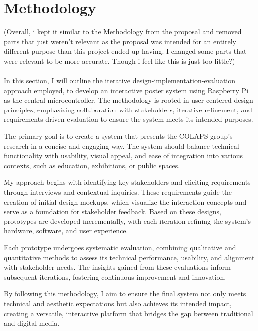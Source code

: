 \chapter{Methodology}
\label{sec:Methodology}

(Overall, i kept it similar to the Methodology from the proposal and removed parts that just weren't relevant as the proposal was intended for an entirely different purpose than this project ended up having. I changed some parts that were relevant to be more accurate. Though i feel like this is just too little?)\\\\



In this section, I will outline the iterative design-implementation-evaluation approach employed, to develop an interactive poster system using Raspberry Pi as the central microcontroller. The methodology is rooted in user-centered design principles, emphasizing collaboration with stakeholders, iterative refinement, and requirements-driven evaluation to ensure the system meets its intended purposes.

The primary goal is to create a system that presents the COLAPS group's research in a concise and engaging way. The system should balance technical functionality with usability, visual appeal, and ease of integration into various contexts, such as education, exhibitions, or public spaces.

My approach begins with identifying key stakeholders and eliciting requirements through interviews and contextual inquiries. These requirements guide the creation of initial design mockups, which visualize the interaction concepts and serve as a foundation for stakeholder feedback. Based on these designs, prototypes are developed incrementally, with each iteration refining the system's hardware, software, and user experience.

Each prototype undergoes systematic evaluation, combining qualitative and quantitative methods to assess its technical performance, usability, and alignment with stakeholder needs. The insights gained from these evaluations inform subsequent iterations, fostering continuous improvement and innovation.

By following this methodology, I aim to ensure the final system not only meets technical and aesthetic expectations but also achieves its intended impact, creating a versatile, interactive platform that bridges the gap between traditional and digital media.

